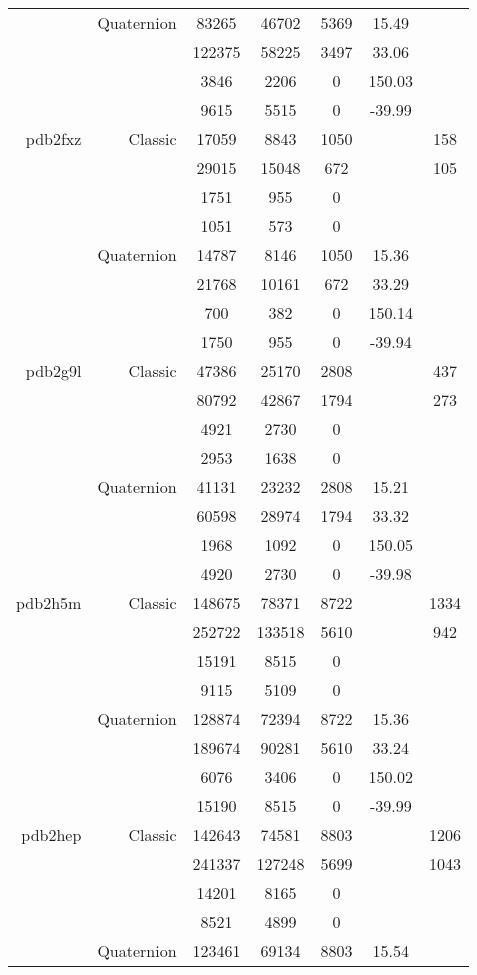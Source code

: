 \begin{xltabular}{\textwidth}{r|rcccSc}
& Quaternion & 83265 & 46702 & 5369 & 15.49 & \\
& & 122375 & 58225 & 3497 & 33.06 & \\
& & 3846 & 2206 & 0 & 150.03 & \\
& & 9615 & 5515 & 0 & -39.99 & \\ \addlinespace
pdb2fxz & Classic & 17059 & 8843 & 1050 & & 158 \\
& & 29015 & 15048 & 672 & & 105 \\
& & 1751 & 955 & 0 & & \\
& & 1051 & 573 & 0 & & \\
& Quaternion & 14787 & 8146 & 1050 & 15.36 & \\
& & 21768 & 10161 & 672 & 33.29 & \\
& & 700 & 382 & 0 & 150.14 & \\
& & 1750 & 955 & 0 & -39.94 & \\ \addlinespace
pdb2g9l & Classic & 47386 & 25170 & 2808 & & 437 \\
& & 80792 & 42867 & 1794 & & 273 \\
& & 4921 & 2730 & 0 & & \\
& & 2953 & 1638 & 0 & & \\
& Quaternion & 41131 & 23232 & 2808 & 15.21 & \\
& & 60598 & 28974 & 1794 & 33.32 & \\
& & 1968 & 1092 & 0 & 150.05 & \\
& & 4920 & 2730 & 0 & -39.98 & \\ \addlinespace
pdb2h5m & Classic & 148675 & 78371 & 8722 & & 1334 \\
& & 252722 & 133518 & 5610 & & 942 \\
& & 15191 & 8515 & 0 & & \\
& & 9115 & 5109 & 0 & & \\
& Quaternion & 128874 & 72394 & 8722 & 15.36 & \\
& & 189674 & 90281 & 5610 & 33.24 & \\
& & 6076 & 3406 & 0 & 150.02 & \\
& & 15190 & 8515 & 0 & -39.99 & \\ \addlinespace
pdb2hep & Classic & 142643 & 74581 & 8803 & & 1206 \\
& & 241337 & 127248 & 5699 & & 1043 \\
& & 14201 & 8165 & 0 & & \\
& & 8521 & 4899 & 0 & & \\
& Quaternion & 123461 & 69134 & 8803 & 15.54 & \\

\end{xltabular}
